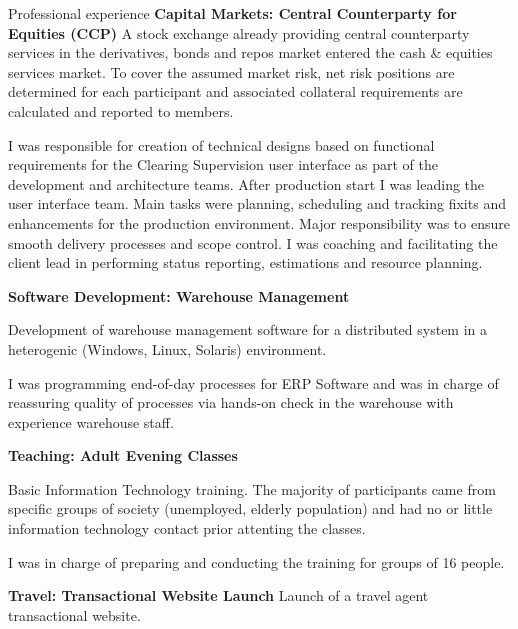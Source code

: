 \begin{rubric}{Professional experience}
\entry*[12/2001 - 06/2003] \textbf{Capital Markets: Central Counterparty for Equities (CCP)}\newline
{} 
A stock exchange already providing central counterparty services in the derivatives, bonds and repos market entered the cash \& equities services market. To cover the assumed market risk, net risk positions are determined for each participant and associated collateral requirements are calculated and reported to members. 

I was responsible for creation of technical designs based on functional requirements for the Clearing Supervision user interface as part of the development and architecture teams.
After production start I was leading the user interface team. Main tasks were planning, scheduling and tracking fixits and enhancements for the production environment. Major responsibility was to ensure smooth delivery processes and scope control. I was coaching and facilitating the client lead in performing status reporting,
estimations and resource planning.


\entry*[01/2001 - 10/2001] \textbf{Software Development: Warehouse Management}\newline

Development of warehouse management software for a distributed system in a heterogenic (Windows, Linux, Solaris) environment.

I was programming end-of-day processes for ERP Software and was in charge of reassuring quality of processes via hands-on check in the warehouse with experience warehouse staff.

\entry*[09/1997 - 05/2001] \textbf{Teaching: Adult Evening Classes}\newline

Basic Information Technology training. The majority of participants came from specific groups of society (unemployed, elderly population) and had no or little information technology contact prior attenting the classes.

I was in charge of preparing and conducting the training for groups of 16 people.

\entry*[06/1999 - 10/1999] \textbf{Travel: Transactional Website Launch}\newline
{} 
Launch of a travel agent transactional website. 


\end{rubric}
